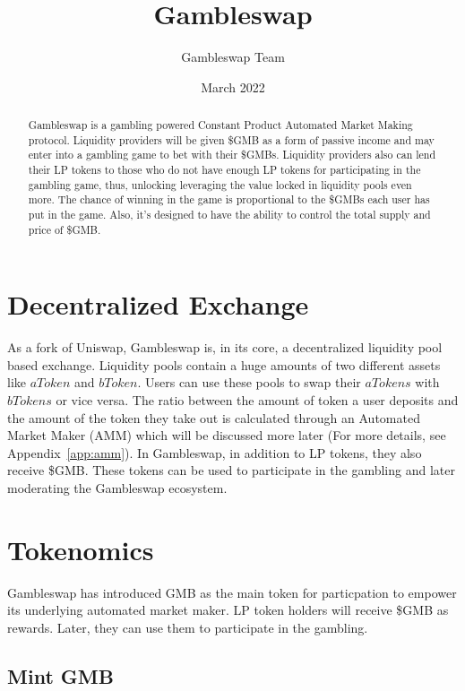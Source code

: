 \documentclass{article}
\title{Gambleswap}
\author{Gambleswap Team}
\date{March 2022}
\begin{document}
\maketitle

\begin{abstract}

Gambleswap is a gambling powered Constant Product Automated Market Making protocol. Liquidity providers will be given \$GMB as a form of passive income and may enter into a gambling game to bet with their \$GMBs. Liquidity providers also can lend their LP tokens to those who do not have enough LP tokens for participating in the gambling game, thus, unlocking leveraging the value locked in liquidity pools even more. 
The chance of winning in the game is proportional to the \$GMBs each user has put in the game. Also, it's designed to have the ability to control the total supply and price of \$GMB.

\end{abstract}

\section{Decentralized Exchange}
As a fork of Uniswap, Gambleswap is, in its core, a decentralized liquidity pool based exchange. Liquidity pools contain a huge amounts of two different assets like $aToken$ and $bToken$. 
Users can use these pools to swap their $aTokens$ with $bTokens$ or vice versa. The ratio between the amount of token a user deposits and the amount of the token they take out is calculated through an Automated Market Maker (AMM) which will be discussed more later (For more details, see Appendix~\ref{app:amm}).
In Gambleswap, in addition to LP tokens, they also receive \$GMB. These tokens can be used to participate in the gambling and later moderating the Gambleswap ecosystem.

\section{Tokenomics}

Gambleswap has introduced GMB as the main token for particpation to empower its underlying automated market maker. 
LP token holders will receive \$GMB as rewards. Later, they can use them to participate in the gambling.

\subsection{Mint GMB}
\end{document}
